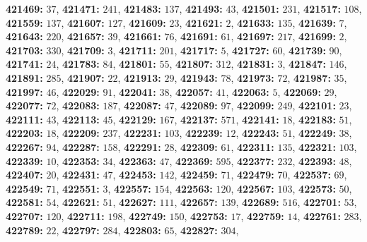 \textsf{\bfseries 421469:} $37$, \textsf{\bfseries 421471:} $241$, \textsf{\bfseries 421483:} $137$, \textsf{\bfseries 421493:} $43$, \textsf{\bfseries 421501:} $231$, \textsf{\bfseries 421517:} $108$, \textsf{\bfseries 421559:} $137$, \textsf{\bfseries 421607:} $127$, \textsf{\bfseries 421609:} $23$, \textsf{\bfseries 421621:} $2$, \textsf{\bfseries 421633:} $135$, \textsf{\bfseries 421639:} $7$, \textsf{\bfseries 421643:} $220$, \textsf{\bfseries 421657:} $39$, \textsf{\bfseries 421661:} $76$, \textsf{\bfseries 421691:} $61$, \textsf{\bfseries 421697:} $217$, \textsf{\bfseries 421699:} $2$, \textsf{\bfseries 421703:} $330$, \textsf{\bfseries 421709:} $3$, \textsf{\bfseries 421711:} $201$, \textsf{\bfseries 421717:} $5$, \textsf{\bfseries 421727:} $60$, \textsf{\bfseries 421739:} $90$, \textsf{\bfseries 421741:} $24$, \textsf{\bfseries 421783:} $84$, \textsf{\bfseries 421801:} $55$, \textsf{\bfseries 421807:} $312$, \textsf{\bfseries 421831:} $3$, \textsf{\bfseries 421847:} $146$, \textsf{\bfseries 421891:} $285$, \textsf{\bfseries 421907:} $22$, \textsf{\bfseries 421913:} $29$, \textsf{\bfseries 421943:} $78$, \textsf{\bfseries 421973:} $72$, \textsf{\bfseries 421987:} $35$, \textsf{\bfseries 421997:} $46$, \textsf{\bfseries 422029:} $91$, \textsf{\bfseries 422041:} $38$, \textsf{\bfseries 422057:} $41$, \textsf{\bfseries 422063:} $5$, \textsf{\bfseries 422069:} $29$, \textsf{\bfseries 422077:} $72$, \textsf{\bfseries 422083:} $187$, \textsf{\bfseries 422087:} $47$, \textsf{\bfseries 422089:} $97$, \textsf{\bfseries 422099:} $249$, \textsf{\bfseries 422101:} $23$, \textsf{\bfseries 422111:} $43$, \textsf{\bfseries 422113:} $45$, \textsf{\bfseries 422129:} $167$, \textsf{\bfseries 422137:} $571$, \textsf{\bfseries 422141:} $18$, \textsf{\bfseries 422183:} $51$, \textsf{\bfseries 422203:} $18$, \textsf{\bfseries 422209:} $237$, \textsf{\bfseries 422231:} $103$, \textsf{\bfseries 422239:} $12$, \textsf{\bfseries 422243:} $51$, \textsf{\bfseries 422249:} $38$, \textsf{\bfseries 422267:} $94$, \textsf{\bfseries 422287:} $158$, \textsf{\bfseries 422291:} $28$, \textsf{\bfseries 422309:} $61$, \textsf{\bfseries 422311:} $135$, \textsf{\bfseries 422321:} $103$, \textsf{\bfseries 422339:} $10$, \textsf{\bfseries 422353:} $34$, \textsf{\bfseries 422363:} $47$, \textsf{\bfseries 422369:} $595$, \textsf{\bfseries 422377:} $232$, \textsf{\bfseries 422393:} $48$, \textsf{\bfseries 422407:} $20$, \textsf{\bfseries 422431:} $47$, \textsf{\bfseries 422453:} $142$, \textsf{\bfseries 422459:} $71$, \textsf{\bfseries 422479:} $70$, \textsf{\bfseries 422537:} $69$, \textsf{\bfseries 422549:} $71$, \textsf{\bfseries 422551:} $3$, \textsf{\bfseries 422557:} $154$, \textsf{\bfseries 422563:} $120$, \textsf{\bfseries 422567:} $103$, \textsf{\bfseries 422573:} $50$, \textsf{\bfseries 422581:} $54$, \textsf{\bfseries 422621:} $51$, \textsf{\bfseries 422627:} $111$, \textsf{\bfseries 422657:} $139$, \textsf{\bfseries 422689:} $516$, \textsf{\bfseries 422701:} $53$, \textsf{\bfseries 422707:} $120$, \textsf{\bfseries 422711:} $198$, \textsf{\bfseries 422749:} $150$, \textsf{\bfseries 422753:} $17$, \textsf{\bfseries 422759:} $14$, \textsf{\bfseries 422761:} $283$, \textsf{\bfseries 422789:} $22$, \textsf{\bfseries 422797:} $284$, \textsf{\bfseries 422803:} $65$, \textsf{\bfseries 422827:} $304$, 
